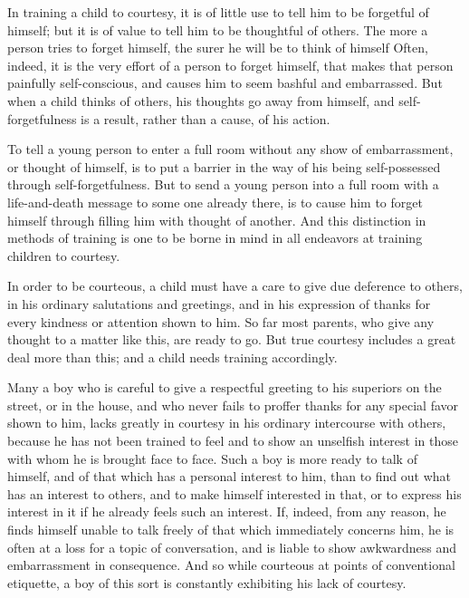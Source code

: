 \documentclass[
]{book}
\begin{document}
In training a child to courtesy, it is of little use to tell him to be forgetful of himself; but it is of value to tell him to be thoughtful of others. The more a person tries to forget himself, the surer he will be to think of himself Often, indeed, it is the very effort of a person to forget himself, that makes that person painfully self-conscious, and causes him to seem bashful and embarrassed. But when a child thinks of others, his thoughts go away from himself, and self-forgetfulness is a result, rather than a cause, of his action.

To tell a young person to enter a full room without any show of embarrassment, or thought of himself, is to put a barrier in the way of his being self-possessed through self-forgetfulness. But to send a young person into a full room with a life-and-death message to some one already there, is to cause him to forget himself through filling him with thought of another. And this distinction in methods of training is one to be borne in mind in all endeavors at training children to courtesy.

In order to be courteous, a child must have a care to give due deference to others, in his ordinary salutations and greetings, and in his expression of thanks for every kindness or attention shown to him. So far most parents, who give any thought to a matter like this, are ready to go. But true courtesy includes a great deal more than this; and a child needs training accordingly.

Many a boy who is careful to give a respectful greeting to his superiors on the street, or in the house, and who never fails to proffer thanks for any special favor shown to him, lacks greatly in courtesy in his ordinary intercourse with others, because he has not been trained to feel and to show an unselfish interest in those with whom he is brought face to face. Such a boy is more ready to talk of himself, and of that which has a personal interest to him, than to find out what has an interest to others, and to make himself interested in that, or to express his interest in it if he already feels such an interest. If, indeed, from any reason, he finds himself unable to talk freely of that which immediately concerns him, he is often at a loss for a topic of conversation, and is liable to show awkwardness and embarrassment in consequence. And so while courteous at points of conventional etiquette, a boy of this sort is constantly exhibiting his lack of courtesy.
\end{document}
